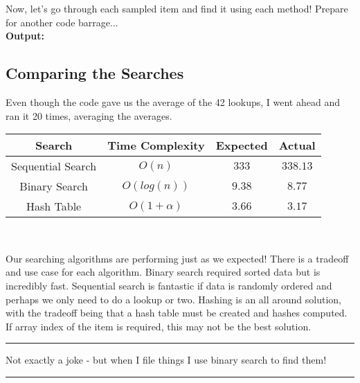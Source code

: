 \documentclass[letterpaper, 10pt]{article}
\begin{document}
Now, let's go through each sampled item and find it using each method! Prepare for another code barrage... \\




\newpage
\textbf{Output:}

\subsection{Comparing the Searches}
\noindent
Even though the code gave us the average of the 42 lookups, I went ahead and ran it 20 times, averaging the averages.
\begin{center}
\begin{tabular}{||c c c c||} 
 \hline
 Search & Time Complexity & Expected & Actual\\ [0.5ex] 
 \hline\hline
 Sequential Search & \( O(n)\) & \(333\) & \(338.13\) \\
 \hline
 Binary Search & \( O(log(n))\) & \(9.38\) & \(8.77\) \\
 \hline
 Hash Table & \( O(1+\alpha)\) & \(3.66\) & \(3.17\) \\
 \hline
\end{tabular}
\\
\end{center}
Our searching algorithms are performing just as we expected! There is a tradeoff and use case for each algorithm. Binary search required sorted data but is incredibly fast. Sequential search is fantastic if data is randomly ordered and perhaps we only need to do a lookup or two. Hashing is an all around solution, with the tradeoff being that a hash table must be created and hashes computed. If array index of the item is required, this may not be the best solution. \\

\hrule
\vspace{.25cm}
Not exactly a joke - but when I file things I use binary search to find them! 
\vspace{.25cm}
\hrule
\end{document}
